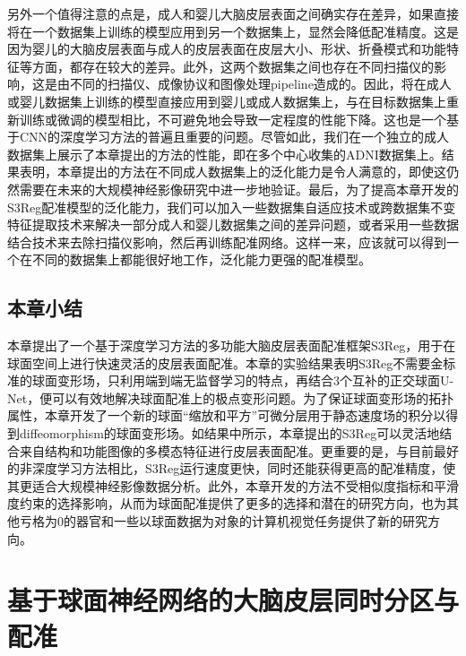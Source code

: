 另外一个值得注意的点是，成人和婴儿大脑皮层表面之间确实存在差异，如果直接将在一个数据集上训练的模型应用到另一个数据集上，显然会降低配准精度。这是因为婴儿的大脑皮层表面与成人的皮层表面在皮层大小、形状、折叠模式和功能特征等方面，都存在较大的差异\cite{li2015construction}。此外，这两个数据集之间也存在不同扫描仪的影响，这是由不同的扫描仪、成像协议和图像处理pipeline造成的。因此，将在成人或婴儿数据集上训练的模型直接应用到婴儿或成人数据集上，与在目标数据集上重新训练或微调的模型相比，不可避免地会导致一定程度的性能下降。这也是一个基于CNN的深度学习方法的普遍且重要的问题\cite{shen2017deep}。尽管如此，我们在一个独立的成人数据集上展示了本章提出的方法的性能，即在多个中心收集的ADNI数据集上。结果表明，本章提出的方法在不同成人数据集上的泛化能力是令人满意的，即使这仍然需要在未来的大规模神经影像研究中进一步地验证。最后，为了提高本章开发的S3Reg配准模型的泛化能力，我们可以加入一些数据集自适应技术\cite{he2020self}或跨数据集不变特征提取技术\cite{zhong2020dika}来解决一部分成人和婴儿数据集之间的差异问题，或者采用一些数据结合技术\cite{zhao2019harmonization}来去除扫描仪影响，然后再训练配准网络。这样一来，应该就可以得到一个在不同的数据集上都能很好地工作，泛化能力更强的配准模型。

\section{本章小结}
本章提出了一个基于深度学习方法的多功能大脑皮层表面配准框架S3Reg，用于在球面空间上进行快速灵活的皮层表面配准。本章的实验结果表明S3Reg不需要金标准的球面变形场，只利用端到端无监督学习的特点，再结合3个互补的正交球面U-Net，便可以有效地解决球面配准上的极点变形问题。为了保证球面变形场的拓扑属性，本章开发了一个新的球面“缩放和平方”可微分层用于静态速度场的积分以得到diffeomorphism的球面变形场。如结果中所示，本章提出的S3Reg可以灵活地结合来自结构和功能图像的多模态特征进行皮层表面配准。更重要的是，与目前最好的非深度学习方法相比，S3Reg运行速度更快，同时还能获得更高的配准精度，使其更适合大规模神经影像数据分析。此外，本章开发的方法不受相似度指标和平滑度约束的选择影响，从而为球面配准提供了更多的选择和潜在的研究方向，也为其他亏格为0的器官和一些以球面数据为对象的计算机视觉任务提供了新的研究方向。









\chapter{基于球面神经网络的大脑皮层同时分区与配准}\label{sec:基于球面神经网络的大脑皮层同时分区与配准}

